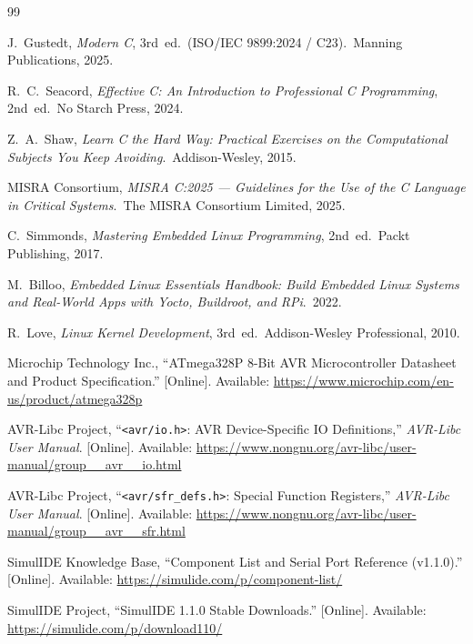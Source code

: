 \documentclass[11pt,a4paper,oneside]{report}
\begin{document}
\begin{thebibliography}{99}

J.~Gustedt, \emph{Modern C}, 3rd~ed.\ (ISO/IEC 9899:2024 / C23).\ Manning Publications, 2025.

R.~C.~Seacord, \emph{Effective C: An Introduction to Professional C Programming}, 2nd~ed.\ No Starch Press, 2024.

Z.~A.~Shaw, \emph{Learn C the Hard Way: Practical Exercises on the Computational Subjects You Keep Avoiding}.\ Addison-Wesley, 2015.

MISRA Consortium, \emph{MISRA C:2025 --- Guidelines for the Use of the C Language in Critical Systems}.\ The MISRA Consortium Limited, 2025.

C.~Simmonds, \emph{Mastering Embedded Linux Programming}, 2nd~ed.\ Packt Publishing, 2017.

M.~Billoo, \emph{Embedded Linux Essentials Handbook: Build Embedded Linux Systems and Real-World Apps with Yocto, Buildroot, and RPi}.\ 2022.

R.~Love, \emph{Linux Kernel Development}, 3rd~ed.\ Addison-Wesley Professional, 2010.

Microchip Technology Inc., ``ATmega328P 8-Bit AVR Microcontroller Datasheet and Product Specification.'' [Online]. Available: \url{https://www.microchip.com/en-us/product/atmega328p}

AVR-Libc Project, ``\texttt{<avr/io.h>}: AVR Device-Specific IO Definitions,'' \emph{AVR-Libc User Manual}. [Online]. Available: \url{https://www.nongnu.org/avr-libc/user-manual/group__avr__io.html}

AVR-Libc Project, ``\texttt{<avr/sfr\_defs.h>}: Special Function Registers,'' \emph{AVR-Libc User Manual}. [Online]. Available: \url{https://www.nongnu.org/avr-libc/user-manual/group__avr__sfr.html}

SimulIDE Knowledge Base, ``Component List and Serial Port Reference (v1.1.0).'' [Online]. Available: \url{https://simulide.com/p/component-list/}

SimulIDE Project, ``SimulIDE 1.1.0 Stable Downloads.'' [Online]. Available: \url{https://simulide.com/p/download110/}


\end{thebibliography}
\end{document}

